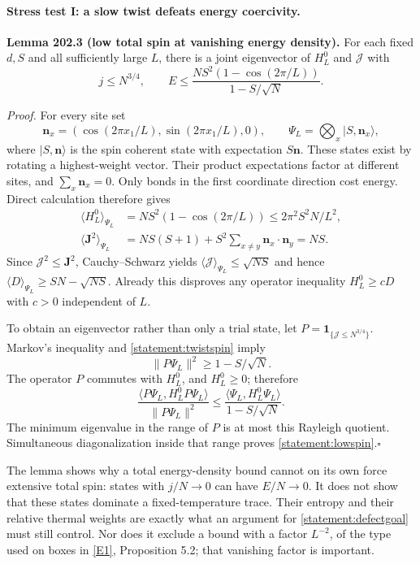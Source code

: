 \documentclass[11pt]{article}
\newcommand{\eref}[2]{\hyperlink{extra:#1:#2}{[E#2]}}
\begin{document}
	\paragraph{Stress test I: a slow twist defeats energy coercivity.}
	\textbf{Lemma 202.3 (low total spin at vanishing energy density).}
	For each fixed $d,S$ and all sufficiently large $L$, there is a joint
	eigenvector of $H_L^0$ and $\mathcal J$ with
	\begin{equation}\label{statement:lowspin}
		j\leq N^{3/4},\qquad
		E\leq\frac{NS^2(1-\cos(2\pi/L))}{1-S/\sqrt N}.
	\end{equation}
	
	\emph{Proof.}
	For every site set
	\[
	\mathbf n_x=(\cos(2\pi x_1/L),\sin(2\pi x_1/L),0),
	\qquad \Psi_L=\bigotimes_x |S,\mathbf n_x\rangle,
	\]
	where $|S,\mathbf n\rangle$ is the spin coherent state with expectation
	$S\mathbf n$. These states exist by rotating a highest-weight vector.
	Their product expectations factor at different sites, and
	$\sum_x\mathbf n_x=0$. Only bonds in the first coordinate direction
	cost energy. Direct calculation therefore gives
	\begin{align}
		\langle H_L^0\rangle_{\Psi_L}
		&=NS^2(1-\cos(2\pi/L))\leq 2\pi^2S^2N/L^2,
		\label{statement:twistenergy}\\
		\langle\mathbf J^2\rangle_{\Psi_L}
		&=NS(S+1)+S^2\sum_{x\ne y}\mathbf n_x\cdot\mathbf n_y=NS.
		\label{statement:twistspin}
	\end{align}
	Since $\mathcal J^2\leq\mathbf J^2$, Cauchy--Schwarz yields
	$\langle\mathcal J\rangle_{\Psi_L}\leq\sqrt{NS}$ and hence
	$\langle D\rangle_{\Psi_L}\geq SN-\sqrt{NS}$.
	Already this disproves any operator inequality $H_L^0\geq cD$ with
	$c>0$ independent of $L$.
	
	To obtain an eigenvector rather than only a trial state, let
	$P=\mathbf1_{\{\mathcal J\leq N^{3/4}\}}$. Markov's inequality and
	\eqref{statement:twistspin} imply
	\[
	\|P\Psi_L\|^2\geq1-S/\sqrt N.
	\]
	The operator $P$ commutes with $H_L^0$, and $H_L^0\geq0$; therefore
	\[
	\frac{\langle P\Psi_L,H_L^0P\Psi_L\rangle}{\|P\Psi_L\|^2}
	\leq\frac{\langle\Psi_L,H_L^0\Psi_L\rangle}{1-S/\sqrt N}.
	\]
	The minimum eigenvalue in the range of $P$ is at most this Rayleigh
	quotient. Simultaneous diagonalization inside that range proves
	\eqref{statement:lowspin}.\hfill$\square$
	
	The lemma shows why a total energy-density bound cannot on its own
	force extensive total spin: states with $j/N\to0$ can have $E/N\to0$.
	It does not show that these states dominate a fixed-temperature trace.
	Their entropy and their relative thermal weights are exactly what an
	argument for \eqref{statement:defectgoal} must still control. Nor does it
	exclude a bound with a factor $L^{-2}$, of the type used on boxes in
	\eref{statement}{1}, Proposition 5.2; that vanishing factor is important.
	
\end{document}
